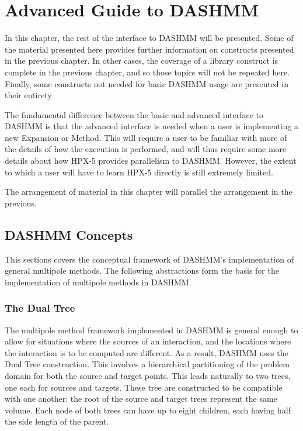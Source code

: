 \chapter{Advanced Guide to DASHMM}
\label{ch:advanced}

In this chapter, the rest of the interface to DASHMM will be presented. Some
of the material presented here provides further information on constructs
presented in the previous chapter. In other cases, the coverage of a library
construct is complete in the previous chapter, and so those topics will not be
repeated here. Finally, some constructs not needed for basic DASHMM usage
are presented in their entirety

The fundamental difference between the basic and advanced interface to
DASHMM is that the advanced interface is needed when a user is implementing
a new Expansion or Method. This will require a user to be familiar with more
of the details of how the execution is performed, and will thus require some
more details about how HPX-5 provides parallelism to DASHMM. However, the
extent to which a user will have to learn HPX-5 directly is still extremely
limited.

The arrangement of material in this chapter will parallel the arrangement in
the previous.

\section{DASHMM Concepts}
\label{sec:advconcepts}

This sections covers the conceptual framework of DASHMM's implementation
of general multipole methods. The following abstractions form the basis for the
implementation of multipole methods in DASHMM.

\subsection{The Dual Tree}

The multipole method framework implemented in DASHMM is general enough to allow
for situations where the sources of an interaction, and the locations where the
interaction is to be computed are different. As a result, DASHMM uses the Dual
Tree construction. This involves a hierarchical partitioning of the problem
domain for both the source and target points. This leads naturally to two
trees, one each for sources and targets. These tree are constructed to be
compatible with one another: the root of the source and target trees represent
the same volume. Each node of both trees can have up to eight children,
each having half the side length of the parent.

